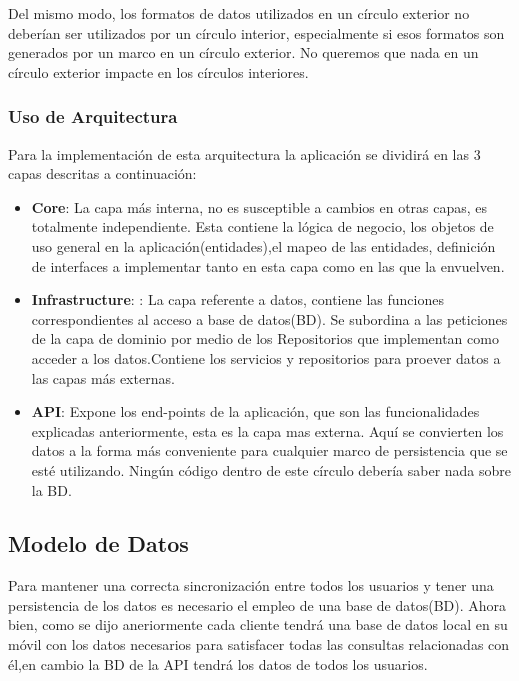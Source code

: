 Del mismo modo, los formatos de datos utilizados en un círculo exterior no deberían ser utilizados por un círculo interior, especialmente si esos formatos son generados por un marco en un círculo exterior. No queremos que nada en un círculo exterior impacte en los círculos interiores. 



\subsubsection{Uso de Arquitectura}
Para la implementación de esta arquitectura la aplicación se dividirá en las 3 capas descritas a continuación:

\begin{itemize}
	\item \textbf{Core}: La capa más interna, no es susceptible a cambios en otras capas, es totalmente independiente. Esta contiene la lógica de negocio, los objetos de uso general en la aplicación(entidades),el mapeo de las entidades, definición de interfaces a implementar tanto en esta capa como en las que la envuelven.
	
	\item \textbf{Infrastructure}: : La capa referente a datos, contiene las funciones correspondientes al acceso a base de datos(BD). Se subordina a las peticiones de la capa de dominio por medio de los
	Repositorios que implementan como acceder a los datos.Contiene los servicios y repositorios para proever datos a las capas más externas.
	
	\item \textbf{API}: Expone los end-points de la aplicación, que son las funcionalidades explicadas anteriormente, esta es la capa mas externa. Aquí se convierten los datos  a la forma más conveniente para cualquier marco de persistencia que se esté utilizando. Ningún código dentro de este círculo debería saber nada sobre la BD.
	
\end{itemize}


\subsection{Modelo de Datos }

Para mantener una correcta sincronización entre todos los usuarios y tener una persistencia de  los datos es necesario el empleo de una base de datos(BD). Ahora bien, como se dijo aneriormente cada cliente tendrá una base de datos local en su móvil con los datos necesarios para satisfacer todas las consultas relacionadas con él,en cambio la BD de la API tendrá los datos de todos los usuarios. 

